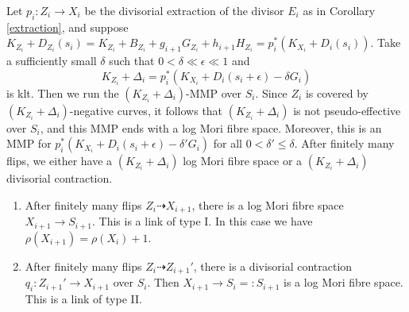 \documentclass[11pt]{amsart}
\begin{document}
\begin{enumerate}
  Let $p_{i}:Z_{i}\to X_{i}$ be the divisorial extraction of the divisor $E_{i}$ as in Corollary \ref{extraction}, and suppose $K_{Z_{i}}+D_{Z_{i}}(s_{i})=K_{Z_{i}}+B_{Z_{i}}+g_{i+1}G_{Z_{i}}+h_{i+1}H_{Z_{i}}=p_{i}^*\left(K_{X_{i}}+D_{i}\left(s_{i}\right)\right)$.
  Take a sufficiently small $\delta$ such that $0<\delta \ll \epsilon \ll 1$ and
  \[
    K_{Z_{i}}+\Delta_{i}=p_{i}^*(K_{X_{i}}+D_{i}(s_{i}+\epsilon)-\delta G_{i})
  \]
  is klt. Then we run the $(K_{Z_{i}}+\Delta_{i})$-MMP  over $S_{i}$. Since $Z_{i}$ is covered by $(K_{Z_{i}}+\Delta_{i})$-negative curves, it follows that $(K_{Z_{i}}+\Delta_{i})$ is not pseudo-effective over $S_{i}$, and this MMP ends with a log Mori fibre space. Moreover, this is an MMP for $p_{i}^*(K_{X_{i}}+D_{i}(s_{i}+\epsilon)-\delta'G_{i})$ for all $0<\delta'\leqslant\delta$. After finitely many flips, we either have a $(K_{Z_{i}}+\Delta_{i})$ log Mori fibre space or a $(K_{Z_{i}}+\Delta_{i})$ divisorial contraction.
  \begin{enumerate}
    \item\label{2b1} After finitely many flips $Z_{i}\dashrightarrow X_{i+1}$, there is a log Mori fibre space $X_{i+1}\to S_{i+1}$. This is a link of type I. In this case we have $\rho(X_{i+1})=\rho(X_{i})+1$.
    \item\label{2b2} After finitely many flips $Z_{i}\dashrightarrow Z_{i+1}'$, there is a divisorial contraction $q_{i}:Z_{i+1}'\to X_{i+1}$ over $S_i$. Then $X_{i+1}\to S_{i}=:S_{i+1}$ is a log Mori fibre space. This is a link of type II.
  \end{enumerate}
\end{enumerate}
\end{document}
